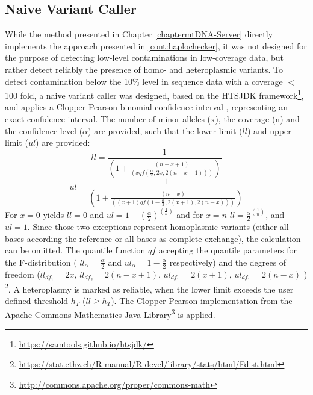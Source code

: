 \subsection{Naive Variant Caller}
While the method presented in Chapter \ref{chaptermtDNA-Server} directly implements the approach presented in \ref{cont:haplochecker}, it was not designed for the purpose of detecting low-level contaminations in low-coverage data, but rather detect reliably the presence of homo- and heteroplasmic variants. To detect contamination below the 10\% level in sequence data with a coverage $<$ 100 fold, a naive variant caller was designed, based on the HTSJDK framework\footnote{\url{https://samtools.github.io/htsjdk/}}, and applies a Clopper Pearson binomial confidence interval \cite{CLOPPER1934}, representing an exact confidence interval. The number of minor alleles (x), the coverage (n) and the confidence level ($\alpha$) are provided, such that the lower limit ($ll$) and upper limit ($ul$) are provided:
\begin{equation}
 ll = \frac{1}{(1 + \frac{(n - x + 1)}{(x qf(\frac{\alpha}{2}, 2 x, 2 (n-x+1)))})}
\end{equation}
\begin{equation}
 ul = \frac{1}{(1 + \frac{(n - x)    }{ ((x + 1)  qf(1-\frac{\alpha}{2}, 2 (x+1), 2 (n-x)))})}
\end{equation}
For $x=0$ yields $ll=0$ and $ul = 1 - (\frac{\alpha}{2})^{(\frac{1}{n})}$ and for $x = n$ $ll = \frac{\alpha}{2}^{(\frac{1}{n})}$, and $ul =1$. Since those two exceptions represent homoplasmic variants (either all bases according the reference or all bases as complete exchange), the calculation can be omitted.
The quantile function $qf$ accepting the quantile parameters for the F-distribution ( $ll_{\alpha} = \frac{\alpha}{2}$ and $ul_{\alpha}= 1-\frac{\alpha}{2}$ respectively) and the degrees of freedom ($ll_{df_1} = 2x$, $ll_{df_2} = 2 (n-x+1)$,  $ul_{df_1} =  2 (x+1)$, $ul_{df_1} =  2 (n-x)$ ) \footnote{\url{https://stat.ethz.ch/R-manual/R-devel/library/stats/html/Fdist.html}}. A heteroplasmy is marked as reliable, when the lower limit exceeds the user defined threshold $h_T$ ($ll  \geq h_T$). The Clopper-Pearson implementation from the Apache Commons Mathematics Java Library\footnote{\url{http://commons.apache.org/proper/commons-math}} is applied.
